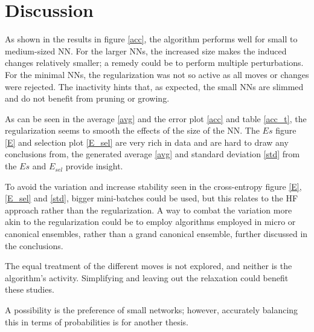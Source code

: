 \chapter{Discussion}

As shown in the results in figure \ref{acc}, the algorithm performs well for small to medium-sized NN. For the larger NNs, the increased size makes the induced changes relatively smaller; a remedy could be to perform multiple perturbations. For the minimal NNs, the regularization was not so active as all moves or changes were rejected. The inactivity hints that, as expected, the small NNs are slimmed and do not benefit from pruning or growing. 

As can be seen in the average \ref{avg} and the error plot \ref{acc} and table \ref{acc_t}, the regularization seems to smooth the effects of the size of the NN. The $Es$ figure \ref{E} and selection plot \ref{E_sel} are very rich in data and are hard to draw any conclusions from, the generated average \ref{avg} and standard deviation \ref{std} from the $Es$ and $E_{sel}$ provide insight. 

To avoid the variation and increase stability seen in the cross-entropy figure \ref{E}, \ref{E_sel} and \ref{std}, bigger mini-batches could be used, but this relates to the HF approach rather than the regularization. A way to combat the variation more akin to the regularization could be to employ algorithms employed in micro or canonical ensembles, rather than a grand canonical ensemble, further discussed in the conclusions.

The equal treatment of the different moves is not explored, and neither is the algorithm's activity. Simplifying and leaving out the relaxation could benefit these studies. 

A possibility is the preference of small networks; however, accurately balancing this in terms of probabilities is for another thesis.
